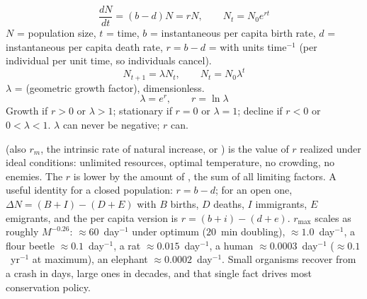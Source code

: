 \begin{keybox}[title={MEMORIZE: the exponential model in both forms}]
\[
\frac{dN}{dt}=(b-d)N=rN,\qquad N_t=N_0e^{rt}
\]
$N$ = population size, $t$ = time, $b$ = instantaneous per capita birth rate,
$d$ = instantaneous per capita death rate, $r=b-d$ =  with units time$^{-1}$ (per individual per unit time, so
individuals cancel).
\[
N_{t+1}=\lambda N_t,\qquad N_t=N_0\lambda^{t}
\]
$\lambda$ =  (geometric growth factor),
dimensionless.
\[
\lambda=e^{r},\qquad r=\ln\lambda
\]
Growth if $r>0$ or $\lambda>1$; stationary if $r=0$ or $\lambda=1$; decline if
$r<0$ or $0<\lambda<1$. $\lambda$ can never be negative; $r$ can.
\end{keybox}

\begin{defbox}[title={DEFINITIONS: the several rates called $r$}]
 (also $r_m$, the intrinsic rate of natural increase, or
) is the value of $r$ realized under ideal conditions:
unlimited resources, optimal temperature, no crowding, no enemies. The
 $r$ is lower by the amount of , the
sum of all limiting factors. A useful identity for a closed population:
$r=b-d$; for an open one,
$\Delta N=(B+I)-(D+E)$ with $B$ births, $D$ deaths, $I$ immigrants, $E$
emigrants, and the per capita version is
$r=(b+i)-(d+e)$.
$r_{\max}$ scales as roughly $M^{-0.26}$: 
$\approx 60$~day$^{-1}$ under optimum ($20$~min doubling), 
$\approx 1.0$~day$^{-1}$, a flour beetle $\approx 0.1$~day$^{-1}$, a rat
$\approx 0.015$~day$^{-1}$, a human $\approx 0.0003$~day$^{-1}$
($\approx 0.1$~yr$^{-1}$ at maximum), an elephant
$\approx 0.0002$~day$^{-1}$. Small organisms recover from a crash in days, large
ones in decades, and that single fact drives most conservation policy.
\end{defbox}

